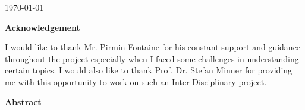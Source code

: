 \documentclass[a4paper, 12pt]{article}
\begin{document}
\begin{titlepage}


{\large \today}\\[2cm] %

\end{titlepage}

\begin{center}
\huge \bfseries Acknowledgement
\end{center}
\thispagestyle{empty}
\vspace{35mm}
I would like to thank Mr. Pirmin Fontaine for his constant support and guidance throughout the project especially when I faced some challenges in understanding certain topics. I would also like to thank Prof. Dr. Stefan Minner for providing me with this opportunity to work on such an Inter-Disciplinary project.

\newpage

\begin{center}
\huge \bfseries Abstract
\end{center}
\thispagestyle{empty}
\vspace{35mm}
\end{document}
